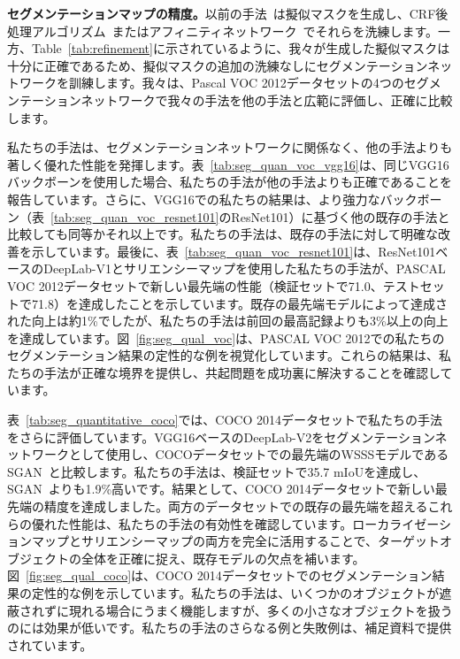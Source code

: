 \documentclass[final]{cvpr}
\begin{document}




\vspace{1mm}
\noindent \textbf{セグメンテーションマップの精度。}以前の手法~\cite{ahn2018learning, fan2020learning, wang2020self}は擬似マスクを生成し、CRF後処理アルゴリズム~\cite{krahenbuhl2011efficient}またはアフィニティネットワーク~\cite{ahn2018learning}でそれらを洗練します。一方、Table~\ref{tab:refinement}に示されているように、我々が生成した擬似マスクは十分に正確であるため、擬似マスクの追加の洗練なしにセグメンテーションネットワークを訓練します。我々は、Pascal VOC 2012データセットの4つのセグメンテーションネットワークで我々の手法を他の手法と広範に評価し、正確に比較します。



私たちの手法は、セグメンテーションネットワークに関係なく、他の手法よりも著しく優れた性能を発揮します。表~\ref{tab:seg_quan_voc_vgg16}は、同じVGG16バックボーンを使用した場合、私たちの手法が他の手法よりも正確であることを報告しています。さらに、VGG16での私たちの結果は、より強力なバックボーン（\ie 表~\ref{tab:seg_quan_voc_resnet101}のResNet101）に基づく他の既存の手法と比較しても同等かそれ以上です。私たちの手法は、既存の手法に対して明確な改善を示しています。最後に、表~\ref{tab:seg_quan_voc_resnet101}は、ResNet101ベースのDeepLab-V1とサリエンシーマップを使用した私たちの手法が、PASCAL VOC 2012データセットで新しい最先端の性能（検証セットで71.0、テストセットで71.8）を達成したことを示しています。既存の最先端モデルによって達成された向上は約1\%でしたが、私たちの手法は前回の最高記録よりも3\%以上の向上を達成しています。図~\ref{fig:seg_qual_voc}は、PASCAL VOC 2012での私たちのセグメンテーション結果の定性的な例を視覚化しています。これらの結果は、私たちの手法が正確な境界を提供し、共起問題を成功裏に解決することを確認しています。

表~\ref{tab:seg_quantitative_coco}では、COCO 2014データセットで私たちの手法をさらに評価しています。VGG16ベースのDeepLab-V2をセグメンテーションネットワークとして使用し、COCOデータセットでの最先端のWSSSモデルであるSGAN~\cite{yao2020saliency}と比較します。私たちの手法は、検証セットで35.7 mIoUを達成し、SGAN~\cite{yao2020saliency}よりも1.9\%高いです。結果として、COCO 2014データセットで新しい最先端の精度を達成しました。両方のデータセットでの既存の最先端を超えるこれらの優れた性能は、私たちの手法の有効性を確認しています。ローカライゼーションマップとサリエンシーマップの両方を完全に活用することで、ターゲットオブジェクトの全体を正確に捉え、既存モデルの欠点を補います。図~\ref{fig:seg_qual_coco}は、COCO 2014データセットでのセグメンテーション結果の定性的な例を示しています。私たちの手法は、いくつかのオブジェクトが遮蔽されずに現れる場合にうまく機能しますが、多くの小さなオブジェクトを扱うのには効果が低いです。私たちの手法のさらなる例と失敗例は、補足資料で提供されています。
\end{document}
